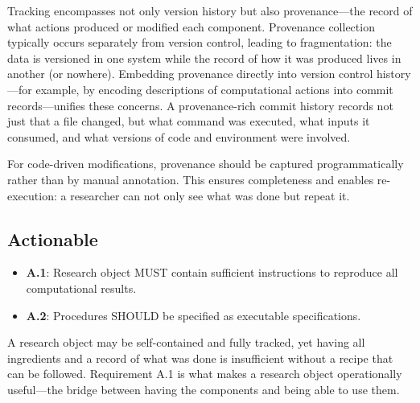\documentclass{article}
\begin{document}
Tracking encompasses not only version history but also provenance---the record of what actions produced or modified each component.
Provenance collection typically occurs separately from version control, leading to fragmentation: the data is versioned in one system while the record of how it was produced lives in another (or nowhere).
Embedding provenance directly into version control history---for example, by encoding descriptions of computational actions into commit records---unifies these concerns.
A provenance-rich commit history records not just that a file changed, but what command was executed, what inputs it consumed, and what versions of code and environment were involved.

For code-driven modifications, provenance should be captured programmatically rather than by manual annotation.
This ensures completeness and enables re-execution: a researcher can not only see what was done but repeat it.



\subsection{Actionable}

\begin{itemize}
    \item \textbf{A.1}: Research object MUST contain sufficient instructions to reproduce all computational results.
    \item \textbf{A.2}: Procedures SHOULD be specified as executable specifications.
\end{itemize}

A research object may be self-contained and fully tracked, yet having all ingredients and a record of what was done is insufficient without a recipe that can be followed.
Requirement A.1 is what makes a research object operationally useful---the bridge between having the components and being able to use them.
\end{document}
